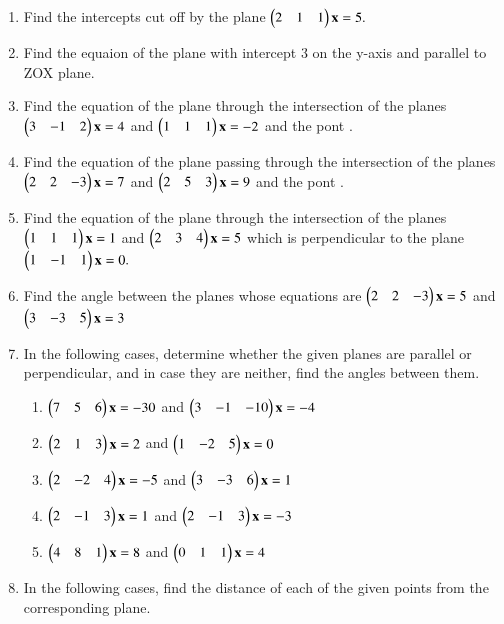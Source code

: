 \begin{enumerate}[label=\arabic*.,ref=\thesubsection.\theenumi]
\begin{enumerate}
\item {}, , .
\end{enumerate}
\item Find the intercepts cut off by the plane 
$
\begin{pmatrix}2 & 1 & 1\end{pmatrix}\mathbf{x}=5.
$
\item Find the equaion of the plane with intercept 3 on the y-axis and parallel to ZOX plane.
\item Find the equation of the plane through the intersection of the planes 
$
\begin{pmatrix}3 & -1 & 2\end{pmatrix}\mathbf{x}=4
$
 and 
$
\begin{pmatrix}1 & 1 & 1\end{pmatrix}\mathbf{x}=-2
$
and the pont .
%
\item Find the equation of the plane passing through the intersection of the planes 
$
\begin{pmatrix}2 & 2 & -3\end{pmatrix}\mathbf{x}=7
$
 and 
$
\begin{pmatrix}2 & 5 & 3\end{pmatrix}\mathbf{x}=9
$
and the pont .
%
\item  Find the equation of the plane through the intersection of the planes
$
\begin{pmatrix}1 & 1 & 1\end{pmatrix}\mathbf{x}=1
$
 and 
$
\begin{pmatrix}2 & 3 & 4\end{pmatrix}\mathbf{x}=5
$
which is perpendicular to the plane 
$
\begin{pmatrix}1 & -1 & 1\end{pmatrix}\mathbf{x}=0.
$
%
\item Find the angle between the planes whose equations are
$
\begin{pmatrix}2 & 2 & -3\end{pmatrix}\mathbf{x}=5
$
 and 
$
\begin{pmatrix}3 & -3 & 5\end{pmatrix}\mathbf{x}=3
$
%
\item In the following cases, determine whether the given planes are parallel or perpendicular, and in case they are neither, find the angles between them.
\begin{enumerate}
\item 
$
\begin{pmatrix}7 & 5 & 6\end{pmatrix}\mathbf{x}=-30
$
 and 
$
\begin{pmatrix}3 & -1 & -10\end{pmatrix}\mathbf{x}=-4
$
%
\item 
$
\begin{pmatrix}2 & 1 & 3\end{pmatrix}\mathbf{x}=2
$
 and 
$
\begin{pmatrix}1 & -2 & 5\end{pmatrix}\mathbf{x}=0
$
%
\item 
$
\begin{pmatrix}2 & -2 & 4\end{pmatrix}\mathbf{x}=-5
$
 and 
$
\begin{pmatrix}3 & -3 & 6\end{pmatrix}\mathbf{x}=1
$
\item 
$
\begin{pmatrix}2 & -1 & 3\end{pmatrix}\mathbf{x}=1
$
 and 
$
\begin{pmatrix}2 & -1 & 3\end{pmatrix}\mathbf{x}=-3
$
\item 
$
\begin{pmatrix}4 & 8 & 1\end{pmatrix}\mathbf{x}=8
$
 and 
$
\begin{pmatrix}0 & 1 & 1\end{pmatrix}\mathbf{x}=4
$
\end{enumerate}
\item In the following cases, find the distance of each of the given points from the corresponding plane.

\end{enumerate}
